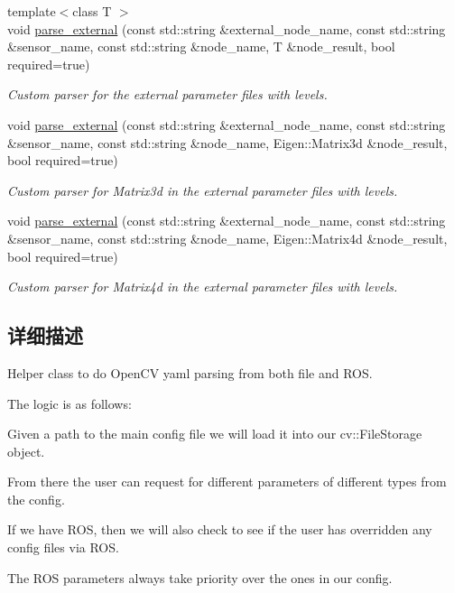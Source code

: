 \begin{DoxyCompactItemize}
{\footnotesize template$<$class T $>$ }\\void \hyperlink{classov__core_1_1YamlParser_ac955d674ec792557a9f53a4b613af0cb}{parse\+\_\+external} (const std\+::string \&external\+\_\+node\+\_\+name, const std\+::string \&sensor\+\_\+name, const std\+::string \&node\+\_\+name, T \&node\+\_\+result, bool required=true)
\begin{DoxyCompactList}\small\item\em Custom parser for the external parameter files with levels. \end{DoxyCompactList}\item 
void \hyperlink{classov__core_1_1YamlParser_a72bdbe517f63793e36e8ec8faacfc9f5}{parse\+\_\+external} (const std\+::string \&external\+\_\+node\+\_\+name, const std\+::string \&sensor\+\_\+name, const std\+::string \&node\+\_\+name, Eigen\+::\+Matrix3d \&node\+\_\+result, bool required=true)
\begin{DoxyCompactList}\small\item\em Custom parser for Matrix3d in the external parameter files with levels. \end{DoxyCompactList}\item 
void \hyperlink{classov__core_1_1YamlParser_a09a826b21ab5de606a5c82472e957e8c}{parse\+\_\+external} (const std\+::string \&external\+\_\+node\+\_\+name, const std\+::string \&sensor\+\_\+name, const std\+::string \&node\+\_\+name, Eigen\+::\+Matrix4d \&node\+\_\+result, bool required=true)
\begin{DoxyCompactList}\small\item\em Custom parser for Matrix4d in the external parameter files with levels. \end{DoxyCompactList}\end{DoxyCompactItemize}


\subsection{详细描述}
Helper class to do Open\+CV yaml parsing from both file and R\+OS. 

The logic is as follows\+:
\begin{DoxyItemize}
\item Given a path to the main config file we will load it into our cv\+::\+File\+Storage object.
\item From there the user can request for different parameters of different types from the config.
\item If we have R\+OS, then we will also check to see if the user has overridden any config files via R\+OS.
\item The R\+OS parameters always take priority over the ones in our config.
\end{DoxyItemize}

